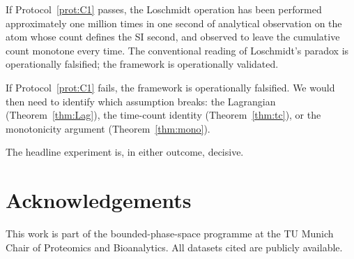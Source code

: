 \documentclass[twocolumn,10pt,a4paper]{article}
\theoremstyle{thmstyle}
\theoremstyle{definition}
\theoremstyle{remark}
\begin{document}
If Protocol~\ref{prot:C1} passes, the Loschmidt operation has been
performed approximately one million times in one second of analytical
observation on the atom whose count defines the SI second, and
observed to leave the cumulative count monotone every time. The
conventional reading of Loschmidt's paradox is operationally
falsified; the framework is operationally validated.

If Protocol~\ref{prot:C1} fails, the framework is operationally
falsified. We would then need to identify which assumption breaks: the
Lagrangian (Theorem~\ref{thm:Lag}), the time-count identity
(Theorem~\ref{thm:tc}), or the monotonicity argument
(Theorem~\ref{thm:mono}).

The headline experiment is, in either outcome, decisive.

\section*{Acknowledgements}

This work is part of the bounded-phase-space programme at the
TU Munich Chair of Proteomics and Bioanalytics. All datasets cited
are publicly available.



\end{document}
